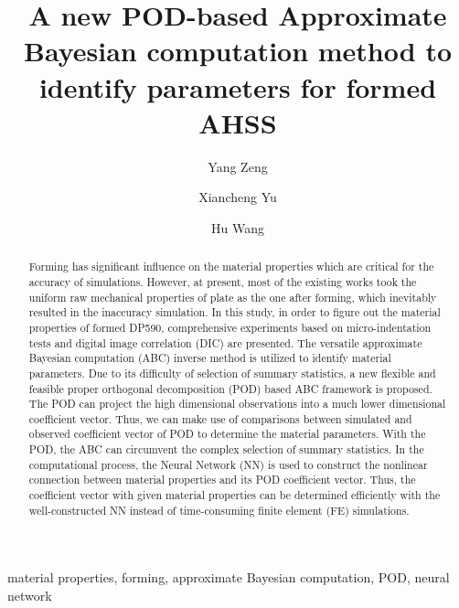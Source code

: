 \documentclass[review]{elsarticle}
\begin{document}
\begin{frontmatter}

\title{A new POD-based Approximate Bayesian computation method to identify parameters for formed AHSS}

\author[mymainaddress,mysecondaryaddress]{Yang Zeng}

\author[mymainaddress,mysecondaryaddress]{Xiancheng Yu}

\author[mysecondaryaddress]{Hu Wang}

\address[mymainaddress]{College of Mechanical and Vehicle engineering, Hunan University}
\address[mysecondaryaddress]{State Key Laboratory of Advanced Design and Manufacturing for Vehicle Body}

\begin{abstract}
Forming has significant influence on the material properties which are critical for the accuracy of simulations. However, at present, most of the existing works took the uniform raw mechanical properties of plate as the one after forming, which inevitably resulted in the inaccuracy simulation. In this study, in order to figure out the material properties of formed DP590, comprehensive experiments based on micro-indentation tests and digital image correlation (DIC) are presented. The versatile approximate Bayesian computation (ABC) inverse method is utilized to identify material parameters. Due to its difficulty of selection of summary statistics, a new flexible and feasible proper orthogonal decomposition (POD) based ABC framework is proposed. The POD can project the high dimensional observations into a much lower dimensional coefficient vector. Thus, we can make use of comparisons between simulated and observed coefficient vector of POD to determine the material parameters. With the POD, the ABC can circumvent the complex selection of summary statistics. In the computational process, the Neural Network (NN) is used to construct the nonlinear connection between material properties and its POD coefficient vector. Thus, the coefficient vector with given material properties can be determined efficiently with the well-constructed NN instead of time-consuming finite element (FE) simulations.
\end{abstract}

\begin{keyword}
material properties, forming, approximate Bayesian computation, POD, neural network
\end{keyword}

\end{frontmatter}
\end{document}
